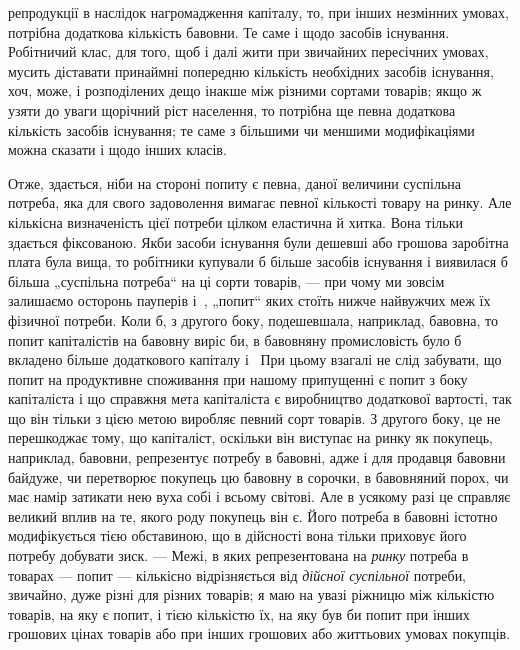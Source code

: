 \parcont{}  %
репродукції в наслідок нагромадження капіталу, то, при інших
незмінних умовах, потрібна додаткова кількість бавовни. Те саме
і щодо засобів існування. Робітничий клас, для того, щоб і далі
жити при звичайних пересічних умовах, мусить діставати принаймні
попередню кількість необхідних засобів існування, хоч,
може, і розподілених дещо інакше між різними сортами товарів;
якщо ж узяти до уваги щорічний ріст населення, то потрібна
ще певна додаткова кількість засобів існування; те саме
з більшими чи меншими модифікаціями можна сказати і щодо
інших класів.

Отже, здається, ніби на стороні попиту є певна, даної величини
суспільна потреба, яка для свого задоволення вимагає
певної кількості товару на ринку. Але кількісна визначеність
цієї потреби цілком еластична й хитка. Вона тільки здається
фіксованою. Якби засоби існування були дешевші або грошова
заробітна плата була вища, то робітники купували б більше
засобів існування і виявилася б більша „суспільна потреба“ на
ці сорти товарів, — при чому ми зовсім залишаємо осторонь
пауперів і~, „попит“ яких стоїть нижче найвужчих меж їх
фізичної потреби. Коли б, з другого боку, подешевшала, наприклад,
бавовна, то попит капіталістів на бавовну виріс би, в бавовняну
промисловість було б вкладено більше додаткового
капіталу і~ При цьому взагалі не слід забувати, що попит
на продуктивне споживання при нашому припущенні є попит
з боку капіталіста і що справжня мета капіталіста є виробництво
додаткової вартості, так що він тільки з цією метою
виробляє певний сорт товарів. З другого боку, це не перешкоджає
тому, що капіталіст, оскільки він виступає на ринку як
покупець, наприклад, бавовни, репрезентує потребу в бавовні,
адже і для продавця бавовни байдуже, чи перетворює покупець
цю бавовну в сорочки, в бавовняний порох, чи має намір
затикати нею вуха собі і всьому світові. Але в усякому разі це
справляє великий вплив на те, якого роду покупець він є. Його
потреба в бавовні істотно модифікується тією обставиною, що
в дійсності вона тільки приховує його потребу добувати зиск. —
Межі, в яких репрезентована на \emph{ринку} потреба в товарах —
попит — кількісно відрізняється від \emph{дійсної суспільної} потреби,
звичайно, дуже різні для різних товарів; я маю на увазі ріжницю
між кількістю товарів, на яку є попит, і тією кількістю
їх, на яку був би попит при інших грошових цінах товарів або
при інших грошових або життьових умовах покупців.

